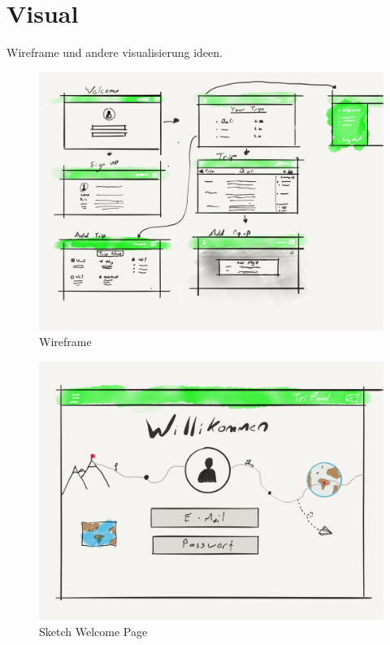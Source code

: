 \documentclass[10pt,a4paper,titlepage,twoside,german,final]{zhawreprt}
\numberwithin{table}{chapter}
\begin{document}
\section{Visual}\label{sec:Visual}
Wireframe und andere visualisierung ideen.
\begin{figure}
  \includegraphics[width=\linewidth]{images/wireframe.png}
  \caption{Wireframe}
  \label{fig:TripPodLogo}
\end{figure}
\begin{figure}
  \includegraphics[width=\linewidth]{images/wire_Welcome.png}
  \caption{Sketch Welcome Page}
  \label{fig:TripPodLogo}
\end{figure}
\end{document}
